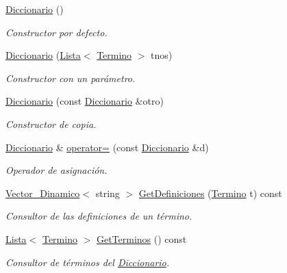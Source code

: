 \begin{DoxyCompactItemize}
\item 
\mbox{\label{classDiccionario_aa0a2191ec706b256c35b5229cc197b15}} 
\mbox{\hyperlink{classDiccionario_aa0a2191ec706b256c35b5229cc197b15}{Diccionario}} ()
\begin{DoxyCompactList}\small\item\em Constructor por defecto. \end{DoxyCompactList}\item 
\mbox{\hyperlink{classDiccionario_a3ca2e015f849faf2ee654d3be8bf69a2}{Diccionario}} (\mbox{\hyperlink{classLista}{Lista}}$<$ \mbox{\hyperlink{classTermino}{Termino}} $>$ tnos)
\begin{DoxyCompactList}\small\item\em Constructor con un parámetro. \end{DoxyCompactList}\item 
\mbox{\hyperlink{classDiccionario_a5f79e840a08666f29b527eb78be167e0}{Diccionario}} (const \mbox{\hyperlink{classDiccionario}{Diccionario}} \&otro)
\begin{DoxyCompactList}\small\item\em Constructor de copia. \end{DoxyCompactList}\item 
\mbox{\hyperlink{classDiccionario}{Diccionario}} \& \mbox{\hyperlink{classDiccionario_aa3c1919f74aab0483e3a484f0a708e07}{operator=}} (const \mbox{\hyperlink{classDiccionario}{Diccionario}} \&d)
\begin{DoxyCompactList}\small\item\em Operador de asignación. \end{DoxyCompactList}\item 
\mbox{\hyperlink{classVector__Dinamico}{Vector\+\_\+\+Dinamico}}$<$ string $>$ \mbox{\hyperlink{classDiccionario_a005029e0a1e8b28dcb504e524d25d57e}{Get\+Definiciones}} (\mbox{\hyperlink{classTermino}{Termino}} t) const
\begin{DoxyCompactList}\small\item\em Consultor de las definiciones de un término. \end{DoxyCompactList}\item 
\mbox{\hyperlink{classLista}{Lista}}$<$ \mbox{\hyperlink{classTermino}{Termino}} $>$ \mbox{\hyperlink{classDiccionario_a4b04ecb76099d4217e5bb98ba6b28b70}{Get\+Terminos}} () const
\begin{DoxyCompactList}\small\item\em Consultor de términos del \mbox{\hyperlink{classDiccionario}{Diccionario}}. \end{DoxyCompactList}\item 

\end{DoxyCompactItemize}
